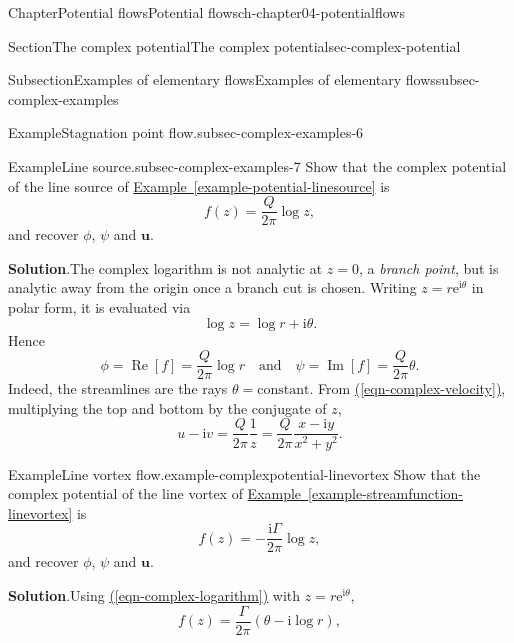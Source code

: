 \documentclass[oneside,10pt,]{book}
\newcommand{\blocktitlefont}{\relax}
\newcommand{\xreffont}{\relax}
\numberwithin{equation}{section}
\renewcommand*{\Re}{\operatorname{Re}}
\renewcommand*{\Im}{\operatorname{Im}}
\newcommand{\e}{\mathrm{e}}
\newcommand{\im}{\mathrm{i}}
\newcommand{\bu}{\boldsymbol{u}}
\begin{document}
\begin{chapterptx}{Chapter}{Potential flows}{}{Potential flows}{}{}{ch-chapter04-potentialflows}
\begin{sectionptx}{Section}{The complex potential}{}{The complex potential}{}{}{sec-complex-potential}
\begin{subsectionptx}{Subsection}{Examples of elementary flows}{}{Examples of elementary flows}{}{}{subsec-complex-examples}
\begin{example}{Example}{Stagnation point flow.}{subsec-complex-examples-6}
\end{example}
\begin{example}{Example}{Line source.}{subsec-complex-examples-7}%
Show that the complex potential of the line source of \hyperref[example-potential-linesource]{Example~{\xreffont\ref{example-potential-linesource}}} is%
\begin{equation}
f(z) = \frac{Q}{2\pi} \log z,\label{eqn-complex-linesource}
\end{equation}
and recover \(\phi\), \(\psi\) and \(\bu\).%
\par\smallskip%
\noindent\textbf{\blocktitlefont Solution}.\hypertarget{subsec-complex-examples-7-4}{}\quad{}The complex logarithm is not analytic at \(z = 0\), a \emph{branch point}, but is analytic away from the origin once a branch cut is chosen. Writing \(z = r\e^{\im \theta}\) in polar form, it is evaluated via%
\begin{equation}
\log z = \log r + \im \theta.\label{eqn-complex-logarithm}
\end{equation}
Hence%
\begin{equation*}
\phi = \Re[f] = \frac{Q}{2\pi} \log r \quad \text{and} \quad
\psi = \Im[f] = \frac{Q}{2\pi} \theta.
\end{equation*}
Indeed, the streamlines are the rays \(\theta = \textrm{constant}\). From \hyperref[eqn-complex-velocity]{({\xreffont\ref{eqn-complex-velocity}})}, multiplying the top and bottom by the conjugate of \(z\),%
\begin{equation*}
u - \im v = \frac{Q}{2\pi} \frac{1}{z} = \frac{Q}{2\pi} \frac{x - \im y}{x^2 + y^2}.
\end{equation*}
%
\end{example}
\begin{example}{Example}{Line vortex flow.}{example-complexpotential-linevortex}%
Show that the complex potential of the line vortex of \hyperref[example-streamfunction-linevortex]{Example~{\xreffont\ref{example-streamfunction-linevortex}}} is%
\begin{equation}
f(z) = -\frac{\im \Gamma}{2\pi} \log z,\label{eq-line-vortex-complex-potential}
\end{equation}
and recover \(\phi\), \(\psi\) and \(\bu\).%
\par\smallskip%
\noindent\textbf{\blocktitlefont Solution}.\hypertarget{example-complexpotential-linevortex-4}{}\quad{}Using \hyperref[eqn-complex-logarithm]{({\xreffont\ref{eqn-complex-logarithm}})} with \(z = r\e^{\im\theta}\),%
\begin{equation*}
f(z) = \frac{\Gamma}{2\pi} (\theta - \im \log r),

\end{equation*}
\end{example}
\end{subsectionptx}
\end{sectionptx}
\end{chapterptx}
\end{document}
